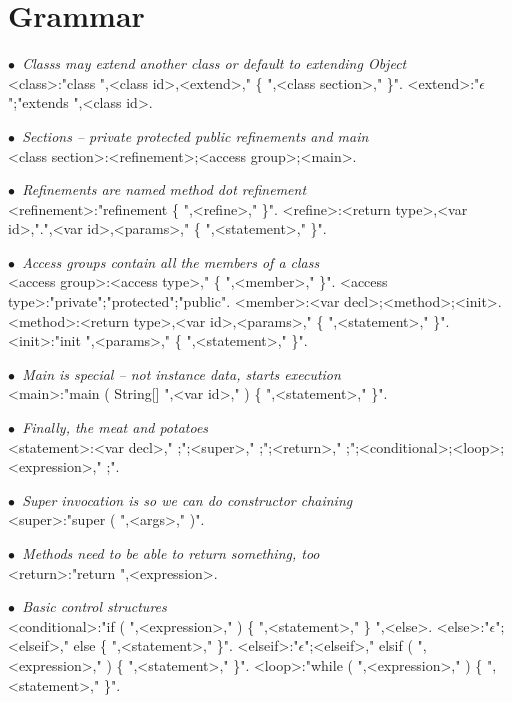 \newcommand{\comment}[1]{{\escapegrammar$\bullet$\it\ #1}\\}

\section{Grammar}

\begin{grammar}

\comment{Classs may extend another class or default to extending Object}
<class>:"class ",<class id>,<extend>," \{ ",<class section>,"{\small *} \}".
<extend>:"$\epsilon$";"extends ",<class id>.

\comment{Sections -- private protected public refinements and main}
<class section>:<refinement>;<access group>;<main>.

\comment{Refinements are named method dot refinement}
<refinement>:"refinement \{ ",<refine>,"{\small *} \}".
<refine>:<return type>,<var id>,".",<var id>,<params>," \{ ",<statement>,"{\small *} \}".

\comment{Access groups contain all the members of a class}
<access group>:<access type>," \{ ",<member>,"{\small *} \}".
<access type>:"private";"protected";"public".
<member>:<var decl>;<method>;<init>.
<method>:<return type>,<var id>,<params>," \{ ",<statement>,"{\small *} \}".
<init>:"init ",<params>," \{ ",<statement>,"{\small *} \}".

\comment{Main is special -- not instance data, starts execution}
<main>:"main ( String[] ",<var id>," ) \{ ",<statement>,"{\small *} \}".

\comment{Finally, the meat and potatoes}
<statement>:<var decl>," ;";<super>," ;";<return>," ;";<conditional>;<loop>;<expression>," ;".

\comment{Super invocation is so we can do constructor chaining}
<super>:"super ( ",<args>," )".

\comment{Methods need to be able to return something, too}
<return>:"return ",<expression>.

\comment{Basic control structures}
<conditional>:"if ( ",<expression>," ) \{ ",<statement>,"{\small *} \} ",<else>.
<else>:"$\epsilon$";<elseif>," else \{ ",<statement>,"{\small *} \}".
<elseif>:"$\epsilon$";<elseif>," elsif ( ",<expression>," ) \{ ",<statement>,"{\small *} \}".
<loop>:"while ( ",<expression>," ) \{ ",<statement>,"{\small *} \}".


\end{grammar}
